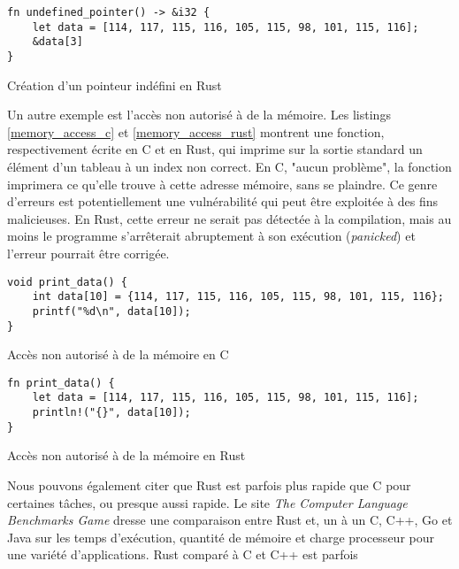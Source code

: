\bigbreak
\begin{code}
    \begin{verbatim}
fn undefined_pointer() -> &i32 {
    let data = [114, 117, 115, 116, 105, 115, 98, 101, 115, 116];
    &data[3]
}
    \end{verbatim}
    \caption{Création d'un pointeur indéfini en Rust}
    \label{undefined_pointer_rust}
\end{code}
\bigbreak
Un autre exemple est l'accès non autorisé à de la mémoire. Les listings \ref{memory_access_c} 
et \ref{memory_access_rust} montrent une fonction, respectivement écrite en C et en Rust, qui 
imprime sur la sortie standard un élément d'un tableau à un index non correct. En C, "aucun problème", 
la fonction imprimera ce qu'elle trouve à cette adresse mémoire, sans se plaindre. Ce genre 
d'erreurs est potentiellement une vulnérabilité qui peut être exploitée à des fins malicieuses.
En Rust, cette erreur ne serait pas détectée à la compilation, mais au moins le programme 
s'arrêterait abruptement à son exécution (\textit{panicked}) et l'erreur pourrait être corrigée.
\bigbreak
\begin{code}
    \begin{verbatim}
void print_data() {
    int data[10] = {114, 117, 115, 116, 105, 115, 98, 101, 115, 116};
    printf("%d\n", data[10]);
}
    \end{verbatim}
    \caption{Accès non autorisé à de la mémoire en C}
    \label{memory_access_c}
\end{code}
\bigbreak
\bigbreak
\begin{code}
    \begin{verbatim}
fn print_data() {
    let data = [114, 117, 115, 116, 105, 115, 98, 101, 115, 116];
    println!("{}", data[10]);
}
    \end{verbatim}
    \caption{Accès non autorisé à de la mémoire en Rust}
    \label{memory_access_rust}
\end{code}
\bigbreak
Nous pouvons également citer que Rust est parfois plus rapide que C pour certaines tâches, ou 
presque aussi rapide. Le site \textit{The Computer Language Benchmarks Game} \cite{ref51} dresse 
une comparaison entre Rust et, un à un C, C++, Go et Java sur les temps d'exécution, quantité de 
mémoire et charge processeur pour une variété d'applications. Rust comparé à C et C++ est parfois 
